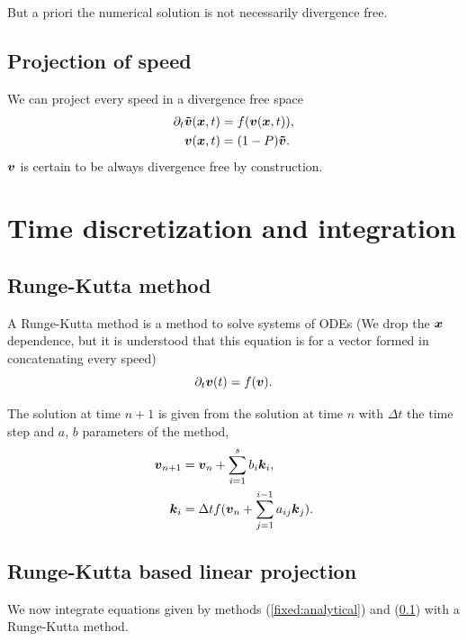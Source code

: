 But a priori the numerical solution is not necessarily divergence free.

\subsection{Projection of speed}
\label{fixed:proj}

We can project every speed in a divergence free space
\begin{subequations}
\begin{align}
  \partial_t {\boldsymbol {\tilde{v}}}({\boldsymbol {x}} ,t)&=f({\boldsymbol {v}}({\boldsymbol {x}},t)),\\
  {\boldsymbol {v}}({\boldsymbol {x}},t)&=(1-P){\boldsymbol {\tilde{v}}}.
\end{align}
\end{subequations}
${\boldsymbol {v}}$ is certain to be always divergence free by construction.

\section{Time discretization and integration}
\label{fixed:timesec}
\subsection{Runge-Kutta method}

A Runge-Kutta method is a method to solve systems of ODEs (We drop the ${\boldsymbol {x}}$ dependence, but it is understood that this equation is for a vector formed in concatenating every speed)
\begin{equation}
\partial_t {\boldsymbol {v}}(t)=f({\boldsymbol {v}}).
\end{equation}

The solution at time $n+1$ is given from the solution at time $n$ with $\Delta t$ the time step and $a$, $b$ parameters of the method,
\begin{subequations}
\begin{align}
	{\boldsymbol {v}}_{n+1}&={\boldsymbol {v}}_{n}+\sum_{i=1}^{s}b_{i}{\boldsymbol {k}}_{i},\\
	{\boldsymbol {k}}_{i}&=\Delta t f({\boldsymbol {v}}_{n}+\sum_{j=1}^{i-1}a_{ij}{\boldsymbol {k}}_{j}).
\end{align}
\end{subequations}

\subsection{Runge-Kutta based linear projection}
\label{fixed:sect:runge-kutta}
We now integrate equations given by methods (\ref{fixed:analytical}) and (\ref{fixed:proj}) with a Runge-Kutta method.

